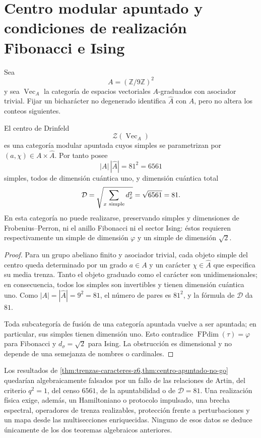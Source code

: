\section[Centro modular y realizaciones topológicas]{Centro modular apuntado y condiciones de realización Fibonacci e Ising}
\label{sec:centro-apuntado-no-go}

Sea
\[
 A=(\mathbb Z/9\mathbb Z)^2
\]
y sea \(\operatorname{Vec}_A\) la categoría de espacios vectoriales
\(A\)-graduados con asociador trivial. Fijar un bicharácter no degenerado
identifica \(\widehat A\) con \(A\), pero no altera los conteos siguientes.

\begin{theorem}
\label{thm:centro-apuntado-no-go}
El centro de Drinfeld
\[
 \mathcal Z(\operatorname{Vec}_A)
\]
es una categoría modular apuntada cuyos simples se parametrizan por
\((a,\chi)\in A\times\widehat A\). Por tanto posee
\[
 |A|\,|\widehat A|=81^2=6561
\]
simples, todos de dimensión cuántica uno, y dimensión cuántica total
\[
 \mathcal D
 =\sqrt{\sum_{x\ {\rm simple}}d_x^2}
 =\sqrt{6561}=81.
\]
En esta categoría no puede realizarse, preservando simples y dimensiones de
Frobenius--Perron, ni el anillo Fibonacci ni el sector Ising: éstos requieren
respectivamente un simple de dimensión \(\varphi\) y un simple de dimensión
\(\sqrt2\).
\end{theorem}

\begin{proof}
Para un grupo abeliano finito y asociador trivial, cada objeto simple del
centro queda determinado por un grado \(a\in A\) y un carácter
\(\chi\in\widehat A\) que especifica su media trenza. Tanto el objeto
graduado como el carácter son unidimensionales; en consecuencia, todos los
simples son invertibles y tienen dimensión cuántica uno. Como
\(|A|=|\widehat A|=9^2=81\), el número de pares es \(81^2\), y la fórmula de
\(\mathcal D\) da \(81\).

Toda subcategoría de fusión de una categoría apuntada vuelve a ser apuntada;
en particular, sus simples tienen dimensión uno. Esto contradice
\(\operatorname{FPdim}(\tau)=\varphi\) para Fibonacci y
\(d_\sigma=\sqrt2\) para Ising. La obstrucción es dimensional y no depende
de una semejanza de nombres o cardinales.
\end{proof}

\begin{criterion}
\label{crit:promocion-sectores-topologicos}
Los resultados de
\cref{thm:trenzas-caracteres-z6,thm:centro-apuntado-no-go} quedarían
algebraicamente falsados por un fallo de las relaciones de Artin, del
criterio \(q^2=1\), del censo \(6561\), de la apuntabilidad o de
\(\mathcal D=81\). Una realización física exige, además, un
Hamiltoniano o protocolo impulsado, una brecha espectral, operadores de
trenza realizables, protección frente a perturbaciones y un mapa desde las
multisecciones enriquecidas. Ninguno de esos datos se deduce únicamente de
los dos teoremas algebraicos anteriores.
\end{criterion}
\fi
